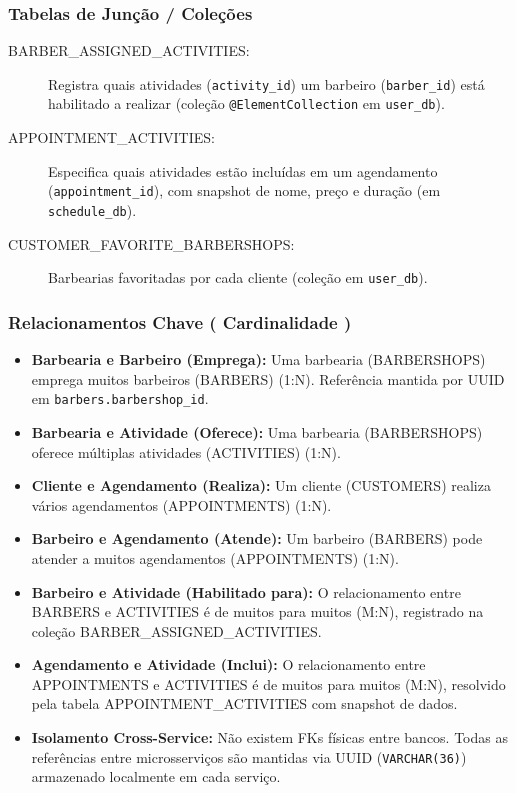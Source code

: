 \documentclass[
    12pt, 
    a4paper, 
    oneside, 
    chapter=TITLE, 
    section=TITLE
]{abntex2}
\begin{document}
\subsubsection{Tabelas de Junção / Coleções}
\begin{description}
    \item[BARBER\_ASSIGNED\_ACTIVITIES:] Registra quais atividades (\texttt{activity\_id}) um barbeiro (\texttt{barber\_id}) está habilitado a realizar (coleção \texttt{@ElementCollection} em \texttt{user\_db}).
    \item[APPOINTMENT\_ACTIVITIES:] Especifica quais atividades estão incluídas em um agendamento (\texttt{appointment\_id}), com snapshot de nome, preço e duração (em \texttt{schedule\_db}).
    \item[CUSTOMER\_FAVORITE\_BARBERSHOPS:] Barbearias favoritadas por cada cliente (coleção em \texttt{user\_db}).
\end{description}

\subsubsection{Relacionamentos Chave ( Cardinalidade )}
\begin{itemize}
    \item \textbf{Barbearia e Barbeiro (Emprega):} Uma barbearia (BARBERSHOPS) emprega muitos barbeiros (BARBERS) (1:N). Referência mantida por UUID em \texttt{barbers.barbershop\_id}.
    \item \textbf{Barbearia e Atividade (Oferece):} Uma barbearia (BARBERSHOPS) oferece múltiplas atividades (ACTIVITIES) (1:N).
    \item \textbf{Cliente e Agendamento (Realiza):} Um cliente (CUSTOMERS) realiza vários agendamentos (APPOINTMENTS) (1:N).
    \item \textbf{Barbeiro e Agendamento (Atende):} Um barbeiro (BARBERS) pode atender a muitos agendamentos (APPOINTMENTS) (1:N).
    \item \textbf{Barbeiro e Atividade (Habilitado para):} O relacionamento entre BARBERS e ACTIVITIES é de muitos para muitos (M:N), registrado na coleção BARBER\_ASSIGNED\_ACTIVITIES.
    \item \textbf{Agendamento e Atividade (Inclui):} O relacionamento entre APPOINTMENTS e ACTIVITIES é de muitos para muitos (M:N), resolvido pela tabela APPOINTMENT\_ACTIVITIES com snapshot de dados.
    \item \textbf{Isolamento Cross-Service:} Não existem FKs físicas entre bancos. Todas as referências entre microsserviços são mantidas via UUID (\texttt{VARCHAR(36)}) armazenado localmente em cada serviço.
\end{itemize}
\end{document}
